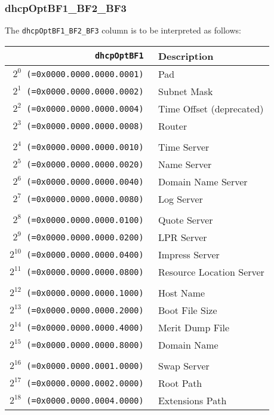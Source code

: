 \documentclass[documentation]{subfiles}
\begin{document}
\subsubsection{dhcpOptBF1\_BF2\_BF3}\label{dhcpOptBF}
The {\tt dhcpOptBF1\_BF2\_BF3} column is to be interpreted as follows:
\begin{small}
    \begin{longtable}{>{\tt}rl}
        \toprule
        {\bf dhcpOptBF1} & {\bf Description}\\
        \midrule\endhead%
        $2^{0}$  (=0x0000.0000.0000.0001) & Pad \\
        $2^{1}$  (=0x0000.0000.0000.0002) & Subnet Mask \\
        $2^{2}$  (=0x0000.0000.0000.0004) & Time Offset (deprecated) \\
        $2^{3}$  (=0x0000.0000.0000.0008) & Router \\
        \\
        $2^{4}$  (=0x0000.0000.0000.0010) & Time Server \\
        $2^{5}$  (=0x0000.0000.0000.0020) & Name Server \\
        $2^{6}$  (=0x0000.0000.0000.0040) & Domain Name Server \\
        $2^{7}$  (=0x0000.0000.0000.0080) & Log Server \\
        \\
        $2^{8}$  (=0x0000.0000.0000.0100) & Quote Server\\
        $2^{9}$  (=0x0000.0000.0000.0200) & LPR Server \\
        $2^{10}$ (=0x0000.0000.0000.0400) & Impress Server \\
        $2^{11}$ (=0x0000.0000.0000.0800) & Resource Location Server \\
        \\
        $2^{12}$ (=0x0000.0000.0000.1000) & Host Name \\
        $2^{13}$ (=0x0000.0000.0000.2000) & Boot File Size \\
        $2^{14}$ (=0x0000.0000.0000.4000) & Merit Dump File \\
        $2^{15}$ (=0x0000.0000.0000.8000) & Domain Name \\
        \\
        $2^{16}$ (=0x0000.0000.0001.0000) & Swap Server \\
        $2^{17}$ (=0x0000.0000.0002.0000) & Root Path \\
        $2^{18}$ (=0x0000.0000.0004.0000) & Extensions Path \\

\end{longtable}
\end{small}
\end{document}
